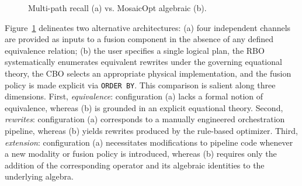 \documentclass[sigconf]{acmart}
\theoremstyle{plain}
\theoremstyle{definition}
\theoremstyle{remark}
\begin{document}
\begin{figure}[t]
{%
  }
  \caption{Multi-path recall (a) vs. MosaicOpt algebraic (b).}
  \label{fig:multipath}
\end{figure}

Figure~\ref{fig:multipath} delineates two alternative architectures: (a) four independent channels are provided as inputs to a fusion component in the absence of any defined equivalence relation; (b) the user specifies a single logical plan, the RBO systematically enumerates equivalent rewrites under the governing equational theory, the CBO selects an appropriate physical implementation, and the fusion policy is made explicit via \texttt{ORDER BY}. This comparison is salient along three dimensions. First, \emph{equivalence}: configuration (a) lacks a formal notion of equivalence, whereas (b) is grounded in an explicit equational theory. Second, \emph{rewrites}: configuration (a) corresponds to a manually engineered orchestration pipeline, whereas (b) yields rewrites produced by the rule-based optimizer. Third, \emph{extension}: configuration (a) necessitates modifications to pipeline code whenever a new modality or fusion policy is introduced, whereas (b) requires only the addition of the corresponding operator and its algebraic identities to the underlying algebra.
\end{document}
